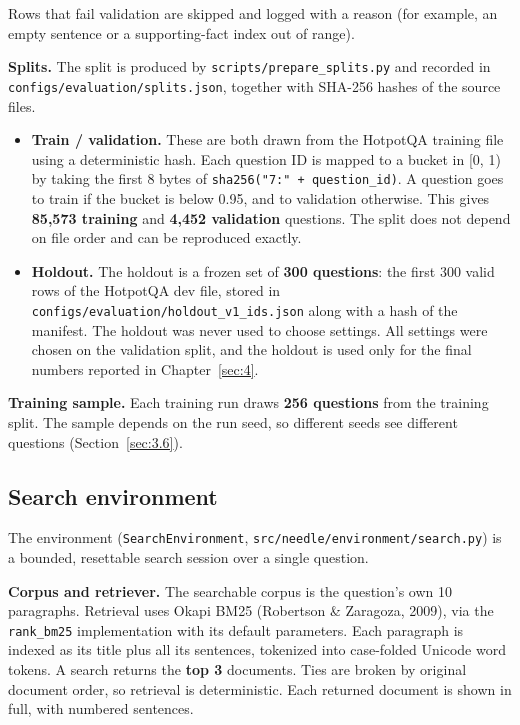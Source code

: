 Rows that fail validation are skipped and logged with a reason (for
example, an empty sentence or a supporting-fact index out of range).

\textbf{Splits.} The split is produced by
\texttt{scripts/\allowbreak{}prepare\_\allowbreak{}splits.\allowbreak{}py}
and recorded in
\texttt{configs/\allowbreak{}evaluation/\allowbreak{}splits.\allowbreak{}json},
together with SHA-256 hashes of the source files.

\begin{itemize}
\tightlist
\item
  \textbf{Train / validation.} These are both drawn from the HotpotQA
  training file using a deterministic hash. Each question ID is mapped
  to a bucket in {[}0, 1) by taking the first 8 bytes of
  \texttt{sha256("7:" + question\_\allowbreak{}id)}. A question goes to
  train if the bucket is below 0.95, and to validation otherwise. This
  gives \textbf{85,573 training} and \textbf{4,452 validation}
  questions. The split does not depend on file order and can be
  reproduced exactly.
\item
  \textbf{Holdout.} The holdout is a frozen set of \textbf{300
  questions}: the first 300 valid rows of the HotpotQA dev file, stored
  in
  \texttt{configs/\allowbreak{}evaluation/\allowbreak{}holdout\_\allowbreak{}v1\_\allowbreak{}ids.\allowbreak{}json}
  along with a hash of the manifest. The holdout was never used to
  choose settings. All settings were chosen on the validation split, and
  the holdout is used only for the final numbers reported in
  Chapter~\ref{sec:4}.
\end{itemize}

\textbf{Training sample.} Each training run draws \textbf{256 questions}
from the training split. The sample depends on the run seed, so
different seeds see different questions (Section~\ref{sec:3.6}).

\subsection{Search environment}\label{sec:3.3}

The environment (\texttt{SearchEnvironment},
\texttt{src/\allowbreak{}needle/\allowbreak{}environment/\allowbreak{}search.\allowbreak{}py})
is a bounded, resettable search session over a single question.

\textbf{Corpus and retriever.} The searchable corpus is the question's
own 10 paragraphs. Retrieval uses Okapi BM25 (Robertson \& Zaragoza,
2009), via the \texttt{rank\_\allowbreak{}bm25} implementation with its
default parameters. Each paragraph is indexed as its title plus all its
sentences, tokenized into case-folded Unicode word tokens. A search
returns the \textbf{top 3} documents. Ties are broken by original
document order, so retrieval is deterministic. Each returned document is
shown in full, with numbered sentences.

